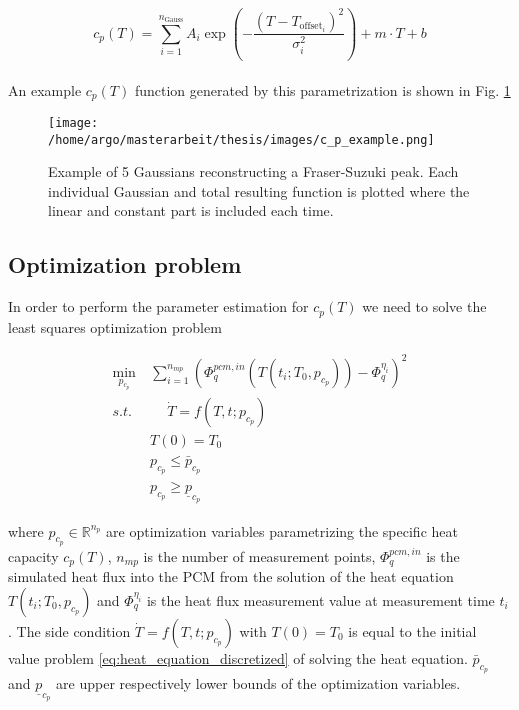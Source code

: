 \documentclass{scrartcl}[12pt, halfparskip]
\numberwithin{equation}{section}
\numberwithin{figure}{section}
\numberwithin{table}{section}
\begin{document}
\begin{equation}
	c_p(T) = \sum_{i=1}^{n_{\text{Gauss}}} A_i \exp\left(- \frac{(T - T_{\text{offset}_i})^2}{\sigma_i^2}\right) + m \cdot T + b
	\label{eq:parametrization_linear_comb_Gauss}
\end{equation} \\

An example $c_p(T)$ function generated by this parametrization is shown in Fig. \ref{fig:parametrization_example_linear_comb_gauss}


\begin{figure}[H]
	\centering
	\texttt{[image: /home/argo/masterarbeit/thesis/images/c\_p\_example.png]}
	\caption{Example of 5 Gaussians reconstructing a Fraser-Suzuki peak. Each individual Gaussian and total resulting function is plotted where the linear and constant part is included each time.}
	\label{fig:parametrization_example_linear_comb_gauss}
\end{figure}









\subsection{Optimization problem}
In order to perform the parameter estimation for $c_p(T)$ we need to solve the least squares optimization problem

\begin{align}
	\min_{p_{c_p}} \ & \sum_{i=1}^{n_{mp}} \left(  \varPhi_{q}^{pcm,in}(T(t_i;T_0,p_{c_p})) - \varPhi_q^{\eta_i} \right)^2 \\
	s.t. \ & \quad \  \dot{T} = f(T,t;p_{c_p}) \nonumber \\
	& T(0) = T_0 \nonumber \\
	& p_{c_p} \le \bar{p}_{c_p} \nonumber \\
	& p_{c_p} \ge \underline{p}_{c_p} \nonumber
	\label{eq:parameter_estimation_least_squares_problem}
\end{align}

where $p_{c_p} \in \mathbb{R}^{n_p}$ are optimization variables parametrizing the specific heat capacity $c_p(T)$, $n_{{mp}}$ is the number of measurement points, $\varPhi_{q}^{pcm,in}$ is the simulated heat flux into the PCM from the solution of the heat equation $T(t_i;T_0,p_{c_p})$ and $\varPhi_q^{\eta_i}$ is the heat flux measurement value at measurement time $t_i$. The side condition $\dot{T} = f(T,t;p_{c_p})$ with $T(0) = T_0$ is equal to the initial value problem \eqref{eq:heat_equation_discretized} of solving the heat equation. $\bar{p}_{c_p}$ and $\underline{p}_{c_p}$ are upper respectively lower bounds of the optimization variables. \\
\end{document}
